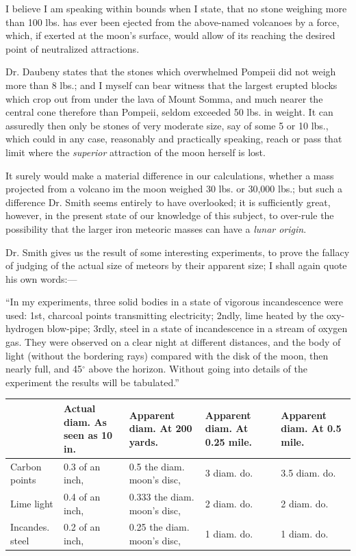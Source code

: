 \documentclass[a4paper, 12pt, oneside]{article}
\begin{document}
I believe I am speaking within bounds when I state, that no stone weighing more than 100 lbs. has ever been ejected from the above-named volcanoes by a force, which, if exerted at the moon's surface, would allow of its reaching the desired point of neutralized attractions.

Dr. Daubeny states that the stones which overwhelmed Pompeii did not weigh more than 8 lbs.; and I myself can bear witness that the largest erupted blocks which crop out from under the lava of Mount Somma, and much nearer the central cone therefore than Pompeii, seldom exceeded 50 lbs. in weight. It can assuredly then only be stones of very moderate size, say of some 5 or 10 lbs., which could in any case, reasonably and practically speaking, reach or pass that limit where the \emph{superior} attraction of the moon herself is lost.

It surely would make a material difference in our calculations, whether a mass projected from a volcano im the moon weighed 30 lbs. or 30,000 lbs.; but such a difference Dr. Smith seems entirely to have overlooked; it is sufficiently great, however, in the present state of our knowledge of this subject, to over-rule the possibility that the larger iron meteoric masses can have a \emph{lunar origin}.

Dr. Smith gives us the result of some interesting experiments, to prove the fallacy of judging of the actual size of meteors by their apparent size; I shall again quote his own words:---

``In my experiments, three solid bodies in a state of vigorous incandescence were used: 1st, charcoal points transmitting electricity; 2ndly, lime heated by the oxy-hydrogen blow-pipe; 3rdly, steel in a state of incandescence in a stream of oxygen gas. They were observed on a clear night at different distances, and the body of light (without the bordering rays) compared with the disk of the moon, then nearly full, and 45$^\circ$ above the horizon. Without going into details of the experiment the results will be tabulated.''
\begin{table}[H]
    \footnotesize
    \centering
    \bfseries
    \Fontauri
    \begin{tabular}{l p{20mm} p{20mm} p{20mm} p{20mm}}
         ~ & Actual diam. As seen as 10 in. & Apparent diam. At 200 yards. & Apparent diam. At 0.25 mile. & Apparent diam. At 0.5 mile. \\ \hline
        Carbon points & 0.3 of an inch, & 0.5 the diam. moon’s disc, & 3 diam. do. & 3.5 diam. do. \\ 
        Lime light & 0.4 of an inch, & 0.333 the diam. moon’s disc, & 2 diam. do. & 2 diam. do. \\ 
        Incandes. steel & 0.2 of an inch, & 0.25 the diam. moon’s disc, & 1 diam. do. & 1 diam. do. \\
    \end{tabular}
\end{table}
\end{document}
